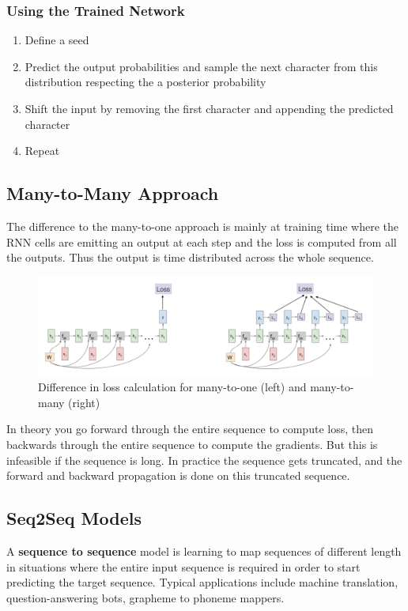 \documentclass[11pt]{article}
\begin{document}
\subsubsection{Using the Trained Network}
\begin{enumerate}
	\item Define a seed
	\item Predict the output probabilities and sample the next character from this distribution respecting the a posterior probability
	\item Shift the input by removing the first character and appending the predicted character
	\item Repeat
\end{enumerate}

\subsection{Many-to-Many Approach}
The difference to the many-to-one approach is mainly at training time where the RNN cells are emitting an output at each step and the loss is computed from all the outputs. Thus the output is time distributed across the whole sequence.

\begin{figure}[H]
	\centering
	\includegraphics[width=0.8\linewidth]{img/generative_rnn_loss}
	\caption{Difference in loss calculation for many-to-one (left) and many-to-many (right)}
	\label{fig:generativernnloss}
\end{figure}

In theory you go forward through the entire sequence to compute loss, then backwards through the entire sequence to compute the gradients. But this is infeasible if the sequence is long. In practice the sequence gets truncated, and the forward and backward propagation is done on this truncated sequence.

\subsection{Seq2Seq Models}
A \textbf{sequence to sequence} model is learning to map sequences of different length in situations where the entire input sequence is required in order to start predicting the target sequence. Typical applications include machine translation, question-answering bots, grapheme to phoneme mappers.
\end{document}
